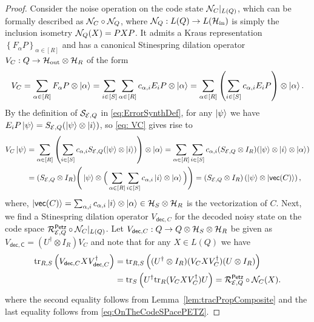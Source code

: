 \documentclass[10pt]{article}
\newcommand{\SIN}{\mathrm{in}}
\newcommand{\SOUT}{\mathrm{out}}
\newcommand{\tr}{\mathrm{tr}}
\newcommand{\p}[1]{\left(#1\right)}
\newcommand{\ppp}[1]{\left\{#1\right\}}
\newcommand{\s}[1]{\mathsf{#1}}
\begin{document}
\begin{proof}
    Consider the noise operation on the code state ${\cal N}_C|_{L(Q)}$, which can be formally described as ${\cal N}_C \circ {\cal N}_Q$, where $\calN_Q:L(Q)\to L(\calH_{\SIN})$ is simply the inclusion isometry ${\cal N}_Q(X)=PXP$. It admits a Kraus representation  $\ppp{F_{\alpha}P}_{\alpha\in [R]}$ and has a canonical Stinespring dilation operator $V_C:Q \to \calH_{\SOUT}\otimes \calH_R$ of the form
    \begin{equation}\label{eq: VC}
        V_{C}=\sum_{\alpha\in[R]}F_{\alpha}P\otimes \ket{\alpha}=\sum_{i\in [S]}\sum_{\alpha\in[R]}c_{\alpha,i}E_iP \otimes \ket{\alpha}=\sum_{\alpha\in[R]} \p{\sum_{i\in [S]}c_{\alpha,i}E_iP }\otimes \ket{\alpha}.
    \end{equation}
    By  the definition of ${\cal S}_{{\cal E},Q}$ in \eqref{eq:ErrorSynthDef}, for any $\ket{\psi}$ we have $E_i P\ket{\psi}=S_{{\cal E},Q}(\ket{\psi}\otimes \ket{i})$, so \eqref{eq: VC} gives rise to
    \begin{align}
        V_{C}\ket{\psi}\nonumber&=\sum_{\alpha\in[R]} \p{\sum_{i\in [S]}c_{\alpha,i}S_{\calE,Q}(\ket{\psi}\otimes \ket{i}) }\otimes \ket{\alpha}=\sum_{\alpha\in[R]} \sum_{i\in [S]}c_{\alpha,i}(S_{\calE,Q}\otimes I_R)(\ket{\psi}\otimes \ket{i}\otimes \ket{\alpha})\\
        &=(S_{\calE,Q}\otimes I_R)\Bigg(\ket{\psi}\otimes \Big(\sum_{\alpha\in[R]} \sum_{i\in [S]}c_{\alpha,i}\ket{i}\otimes \ket{\alpha}\Big)\Bigg)=(S_{\calE,Q}\otimes I_R)\p{\ket{\psi}\otimes \ket{\s{vec}(C)}},\label{eq:VecRepV_C}
    \end{align}
    where, $\ket{\s{vec}(C)}=\sum_{\alpha,i}c_{\alpha,i}\ket{i}\otimes \ket{\alpha}\in \calH_S\otimes \calH_R$ is the vectorization of $C$. 
    Next, we find a Stinespring dilation operator $V_{\s{dec},C}$ for the decoded noisy state on the code space $\calR_{\calE,Q}^{\s{Petz}}\circ \calN_{C}|_{L(Q)}$.  Let $V_{\s{dec},C}: Q\to Q \otimes \calH_S\otimes \calH_R$ be given as $V_{\s{dec,C}}=(U^\dag \otimes I_R )V_C$ and note that for any $X\in L(Q)$ we have 
    \begin{align*}
        \tr_{R,S}\p{V_{\s{dec},C}X V_{\s{dec},C}^\dag}&=\tr_{R,S}\p{(U^\dag \otimes I_R)(V_C X V_C^\dag)(U \otimes I_R) }\\
        &=\tr_S\p{U^\dag \tr_R(V_C X V_C^\dag)U }=\calR_{\calE,Q}^{\s{Petz}}\circ \calN_C(X).
    \end{align*}
     where the second equality follows from Lemma~\ref{lem:tracPropComposite} and the last equality follows from \eqref{eq:OnTheCodeSPacePETZ}. 


\end{proof}
\end{document}
